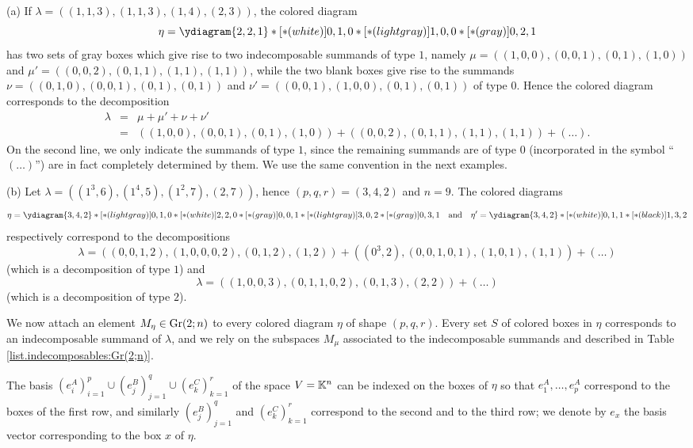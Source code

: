 \documentclass[12pt,reqno]{amsart}
\begin{document}
\begin{example}
\label{Examples:colored.diagrams}
(a) If $\lambda=((1,1,3),(1,1,3),(1,4),(2,3))$, the colored diagram
$$
\eta=\ydiagram{2,2,1}
     *[*(white)]{0,1,0}
     *[*(lightgray)]{1,0,0} *[*(gray)]{0,2,1}
$$
has two sets of gray boxes which give rise to two indecomposable summands of type $1$, namely
$\mu=((1,0,0),(0,0,1),(0,1),(1,0))$
and $\mu'=((0,0,2),(0,1,1),(1,1),(1,1))$,
while the two blank boxes give rise to the summands
$\nu=((0,1,0),(0,0,1),(0,1),(0,1))$ and $\nu'=((0,0,1),(1,0,0),(0,1),(0,1))$ of type $0$.
Hence the colored diagram corresponds to the decomposition
\begin{eqnarray*}
\lambda & = & \mu+\mu'+\nu+\nu' \\
 & = & ((1,0,0),(0,0,1),(0,1),(1,0))+((0,0,2),(0,1,1),(1,1),(1,1))+(\ldots).
\end{eqnarray*}
%
On the second line, we only indicate the summands of type $1$, since the remaining summands are of type $0$ (incorporated in the symbol ``$(\ldots)$'') are in fact completely determined by them.
We use the same convention in the next examples.

(b) Let $\lambda=((1^3,6),(1^4,5),(1^2,7),(2,7))$, hence $(p,q,r)=(3,4,2)$ and $n=9$.
The colored diagrams
$$
\eta=\ydiagram{3,4,2}
     *[*(lightgray)]{0,1,0}
     *[*(white)]{2,2,0}
     *[*(gray)]{0,0,1}
     *[*(lightgray)]{3,0,2} *[*(gray)]{0,3,1}\quad\text{and}\quad \eta'=\ydiagram{3,4,2}
     *[*(white)]{0,1,1} *[*(black)]{1,3,2}
$$
respectively correspond to the decompositions
$$
\lambda=((0,0,1,2),(1,0,0,0,2),(0,1,2),(1,2))+((0^3,2),(0,0,1,0,1),(1,0,1),(1,1))+(\ldots)
$$
(which is a decomposition of type $1$)
and
$$
\lambda=((1,0,0,3),(0,1,1,0,2),(0,1,3),(2,2))+(\ldots)
$$
(which is a decomposition of type $2$).
\end{example}

We now attach an element $M_\eta\in\mathrm{Gr}(2;n)$ to every colored diagram $\eta$ of shape $(p,q,r)$.
Every set $S$ of colored boxes in $\eta$ corresponds to an indecomposable summand of $\lambda$, and we rely on the subspaces $M_\mu$ associated to the indecomposable summands and described in Table \ref{list.indecomposables:Gr(2;n)}.

The basis $(e_i^A)_{i=1}^p\cup (e_j^B)_{j=1}^q\cup (e_k^C)_{k=1}^r$ of the space $V=\mathbb{K}^n$ can be indexed on the boxes of $\eta$ so that $e_1^A,\ldots,e_p^A$ correspond to the boxes of the first row, and similarly $(e_j^B)_{j=1}^q$ and $(e_k^C)_{k=1}^r$ correspond to the second and to the third row;
we denote by $e_x$ the basis vector corresponding to the box $x$ of $\eta$.
\end{document}
